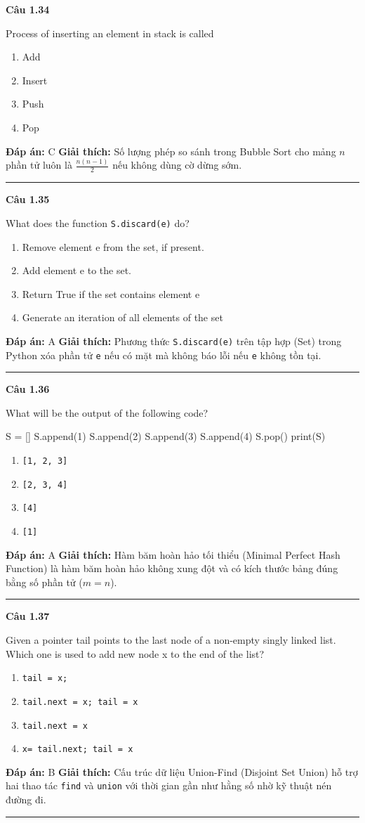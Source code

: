 \documentclass[11pt,a4paper]{article}
\newenvironment{question}[1]{%
  \par\vspace{1em}\noindent\textbf{\large Câu #1}\par\vspace{0.4em}
}{%
  \par\vspace{1em}\hrule\vspace{0.6em}
}
\newenvironment{choices}{%
  \begin{enumerate}[label=\textbf{\Alph*.},leftmargin=2.2em,itemsep=2pt,topsep=3pt]
}{%
  \end{enumerate}
}
\newcommand{\choice}{\item}
\newenvironment{codebox}{%
  \begin{tcolorbox}[colback=gray!8!white,colframe=gray!50!black,arc=1.5mm,boxrule=0.6pt,left=3mm,right=3mm,top=2.5mm,bottom=2.5mm]
  \ttfamily\small
}{%
  \end{tcolorbox}
}
\begin{document}
\begin{question}{1.34}
Process of inserting an element in stack is called
\begin{choices}
\choice Add
\choice Insert
\choice Push
\choice Pop
\end{choices}
\textbf{Đáp án:} C
\textbf{Giải thích:} Số lượng phép so sánh trong Bubble Sort cho mảng $n$ phần tử luôn là $\frac{n(n-1)}{2}$ nếu không dùng cờ dừng sớm.
\end{question}

\begin{question}{1.35}
What does the function \texttt{S.discard(e)} do?
\begin{choices}
\choice Remove element e from the set, if present.
\choice Add element e to the set.
\choice Return True if the set contains element e
\choice Generate an iteration of all elements of the set
\end{choices}
\textbf{Đáp án:} A
\textbf{Giải thích:} Phương thức \texttt{S.discard(e)} trên tập hợp (Set) trong Python xóa phần tử \texttt{e} nếu có mặt mà không báo lỗi nếu \texttt{e} không tồn tại.
\end{question}

\begin{question}{1.36}
What will be the output of the following code?
\begin{codebox}
S = []
S.append(1)
S.append(2)
S.append(3)
S.append(4)
S.pop()
print(S)
\end{codebox}
\begin{choices}
\choice \texttt{[1, 2, 3]}
\choice \texttt{[2, 3, 4]}
\choice \texttt{[4]}
\choice \texttt{[1]}
\end{choices}
\textbf{Đáp án:} A
\textbf{Giải thích:} Hàm băm hoàn hảo tối thiểu (Minimal Perfect Hash Function) là hàm băm hoàn hảo không xung đột và có kích thước bảng đúng bằng số phần tử ($m = n$).
\end{question}

\begin{question}{1.37}
Given a pointer tail points to the last node of a non-empty singly linked list. Which one is used to add new node x to the end of the list?
\begin{choices}
\choice \texttt{tail = x;}
\choice \texttt{tail.next = x; tail = x}
\choice \texttt{tail.next = x}
\choice \texttt{x= tail.next; tail = x}
\end{choices}
\textbf{Đáp án:} B
\textbf{Giải thích:} Cấu trúc dữ liệu Union-Find (Disjoint Set Union) hỗ trợ hai thao tác \texttt{find} và \texttt{union} với thời gian gần như hằng số nhờ kỹ thuật nén đường đi.
\end{question}
\end{document}
